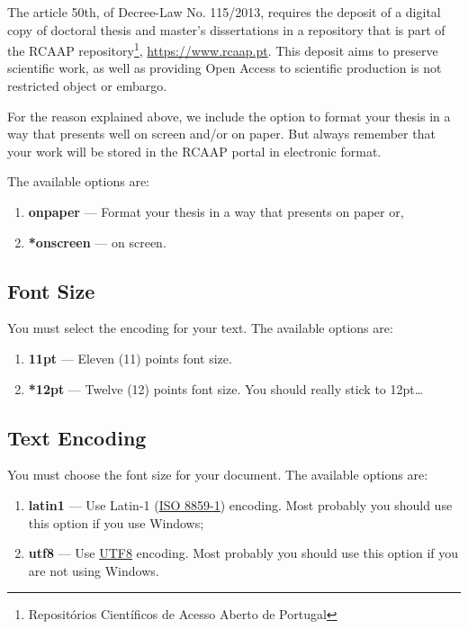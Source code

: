 The article 50th, of Decree-Law No. 115/2013, requires the deposit of a digital copy of doctoral thesis and master's dissertations in a repository that is part of the RCAAP repository\footnote{Repositórios Científicos de Acesso Aberto de Portugal}, \url{https://www.rcaap.pt}. This deposit aims to preserve scientific work, as well as providing Open Access to scientific production is not restricted object or embargo.

For the reason explained above, we include the option to format your thesis in a way that presents well on screen and/or on paper. But always remember that your work will be stored in the RCAAP portal in electronic format.

The available options are:

\begin{enumerate}
    \item \textbf{onpaper} --- Format your thesis in a way that presents on paper or,
    \item \textbf{*onscreen} --- on screen.
\end{enumerate}


\subsection{Font Size} %
\label{ssec:font_size}

You must select the encoding for your text. The available options are:
\begin{enumerate}
    \item \textbf{11pt} --- Eleven (11) points font size.
    \item \textbf{*12pt} --- Twelve (12) points font size. You should really stick to 12pt\ldots
\end{enumerate}


\subsection{Text Encoding} %
\label{ssec:text_encoding}

You must choose the font size for your document. The available options are:
\begin{enumerate}
    \item \textbf{latin1} --- Use Latin-1 (\href{http://en.wikipedia.org/wiki/ISO/IEC_8859-1}{ISO 8859-1}) encoding. Most probably you should use this option if you use Windows;
    \item \textbf{utf8} --- Use \href{http://en.wikipedia.org/wiki/UTF-8}{UTF8} encoding. Most probably you should use this option if you are not using Windows.
\end{enumerate}

